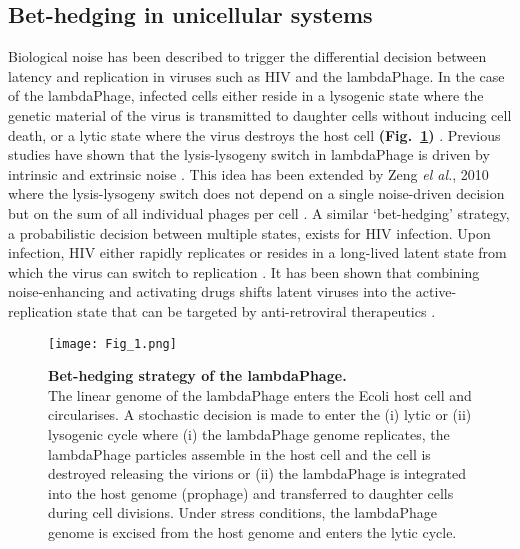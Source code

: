 \newpage

\subsection{Bet-hedging in unicellular systems}

Biological noise has been described to trigger the differential decision between latency and replication in viruses such as \Gls{HIV} and the \gls{lambdaPhage}. In the case of the \gls{lambdaPhage}, infected cells either reside in a lysogenic state where the genetic material of the virus is transmitted to daughter cells without inducing cell death, or a lytic state where the virus destroys the host cell \textbf{(Fig.~\ref{fig0:bedhedging})} \citep{Lieb1953}. Previous studies have shown that the lysis-lysogeny switch in \gls{lambdaPhage} is driven by intrinsic and extrinsic noise \citep{Arkin1998, St-Pierre2008}. This idea has been extended by Zeng \textit{el al.}, 2010 where the lysis-lysogeny switch does not depend on a single noise-driven decision but on the sum of all individual phages per cell \citep{Zeng2010}. A similar ‘bet-hedging’ strategy, a probabilistic decision between multiple states, exists for \Gls{HIV} infection. Upon infection, \Gls{HIV} either rapidly replicates or resides in a long-lived latent state from which the virus can switch to replication \citep{Weinberger2015}. It has been shown that combining noise-enhancing and activating drugs shifts latent viruses into the active-replication state that can be targeted by anti-retroviral therapeutics \citep{Dar2014}. 

\begin{figure}[!h]
\centering
\texttt{[image: Fig\_1.png]}
\caption[Bet-hedging strategy of the \gls{lambdaPhage}]{\textbf{Bet-hedging strategy of the \gls{lambdaPhage}.}\\
The linear genome of the \gls{lambdaPhage} enters the \Gls{Ecoli} host cell and circularises. A stochastic decision is made to enter the (i) lytic or (ii) lysogenic cycle where (i) the \gls{lambdaPhage} genome replicates, the \gls{lambdaPhage} particles assemble in the host cell and the cell is destroyed releasing the virions or (ii) the \gls{lambdaPhage} is integrated into the host genome (prophage) and transferred to daughter cells during cell divisions. Under stress conditions, the \gls{lambdaPhage} genome is excised from the host genome and enters the lytic cycle.}
\label{fig0:bedhedging}
\end{figure}

